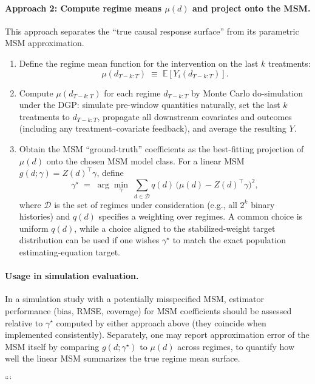 \paragraph{Approach 2: Compute regime means $\mu(d)$ and project onto the MSM.}
This approach separates the ``true causal response surface'' from its parametric MSM
approximation.
\begin{enumerate}
\item Define the regime mean function for the intervention on the last $k$ treatments:
\begin{equation}
\mu(d_{T-k:T}) \;\equiv\; \mathbb E\!\left[ Y_i(d_{T-k:T}) \right].
\end{equation}
\item Compute $\mu(d_{T-k:T})$ for each regime $d_{T-k:T}$ by Monte Carlo do-simulation
under the DGP: simulate pre-window quantities naturally, set the last $k$ treatments to
$d_{T-k:T}$, propagate all downstream covariates and outcomes (including any
treatment--covariate feedback), and average the resulting $Y$.
\item Obtain the MSM ``ground-truth'' coefficients as the best-fitting projection of
$\mu(d)$ onto the chosen MSM model class. For a linear MSM
$g(d;\gamma)=Z(d)^\top\gamma$, define
\begin{equation}
\gamma^\star \;=\; \arg\min_{\gamma}\; \sum_{d\in\mathcal D}
q(d)\,\Big(\mu(d)-Z(d)^\top\gamma\Big)^2,
\end{equation}
where $\mathcal D$ is the set of regimes under consideration (e.g., all $2^k$ binary
histories) and $q(d)$ specifies a weighting over regimes. A common choice is uniform
$q(d)$, while a choice aligned to the stabilized-weight target distribution can be used if
one wishes $\gamma^\star$ to match the exact population estimating-equation target.
\end{enumerate}

\paragraph{Usage in simulation evaluation.}
In a simulation study with a potentially misspecified MSM, estimator performance (bias,
RMSE, coverage) for MSM coefficients should be assessed relative to $\gamma^\star$
computed by either approach above (they coincide when implemented consistently). Separately,
one may report approximation error of the MSM itself by comparing $g(d;\gamma^\star)$ to
$\mu(d)$ across regimes, to quantify how well the linear MSM summarizes the true regime
mean surface.


```
